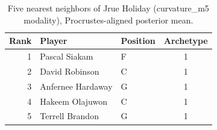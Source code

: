\begin{table}[htbp]
  \centering\small
  \begin{tabular}{rllc}
    \toprule
    Rank & Player & Position & Archetype \\
    \midrule
    1 & Pascal Siakam & F & 1 \\
    2 & David Robinson & C & 1 \\
    3 & Anfernee Hardaway & G & 1 \\
    4 & Hakeem Olajuwon & C & 1 \\
    5 & Terrell Brandon & G & 1 \\
    \bottomrule
  \end{tabular}
  \caption{Five nearest neighbors of Jrue Holiday (curvature_m5 modality), Procrustes-aligned posterior mean.}
  \label{tab:Jrue_Holiday_neighbors_curvature_m5}
\end{table}

